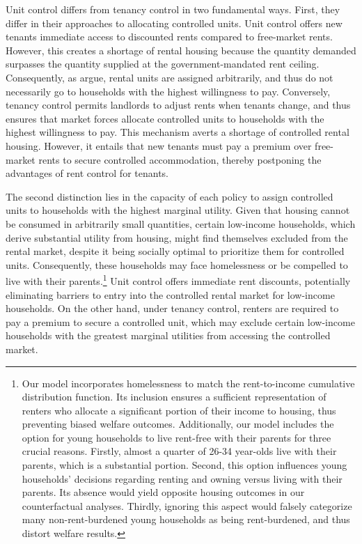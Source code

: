 \documentclass[parskip=full]{article}
\begin{document}
Unit control differs from tenancy control in two fundamental ways. First, they differ in their approaches to allocating controlled units. Unit control offers new tenants immediate access to discounted rents compared to free-market rents. However, this creates a shortage of rental housing because the quantity demanded surpasses the quantity supplied at the government-mandated rent ceiling. Consequently, as \citet{gl-2003} argue, rental units are assigned arbitrarily, and thus do not necessarily go to households with the highest willingness to pay. Conversely, tenancy control permits landlords to adjust rents when tenants change, and thus ensures that market forces allocate controlled units to households with the highest willingness to pay. This mechanism averts a shortage of controlled rental housing. However, it entails that new tenants must pay a premium over free-market rents to secure controlled accommodation, thereby postponing the advantages of rent control for tenants.

The second distinction lies in the capacity of each policy to assign controlled units to households with the highest marginal utility. Given that housing cannot be consumed in arbitrarily small quantities, certain low-income households, which derive substantial utility from housing, might find themselves excluded from the rental market, despite it being socially optimal to prioritize them for controlled units. Consequently, these households may face homelessness or be compelled to live with their parents.\footnote{Our model incorporates homelessness to match the rent-to-income cumulative distribution function. Its inclusion ensures a sufficient representation of renters who allocate a significant portion of their income to housing, thus preventing biased welfare outcomes. Additionally, our model includes the option for young households to live rent-free with their parents for three crucial reasons. Firstly, almost a quarter of 26-34 year-olds live with their parents, which is a substantial portion. Second, this option influences young households' decisions regarding renting and owning versus living with their parents. Its absence would yield opposite housing outcomes in our counterfactual analyses. Thirdly, ignoring this aspect would falsely categorize many non-rent-burdened young households as being rent-burdened, and thus distort welfare results.} Unit control offers immediate rent discounts, potentially eliminating barriers to entry into the controlled rental market for low-income households. On the other hand, under tenancy control, renters are required to pay a premium to secure a controlled unit, which may exclude certain low-income households with the greatest marginal utilities from accessing the controlled market.
\end{document}
